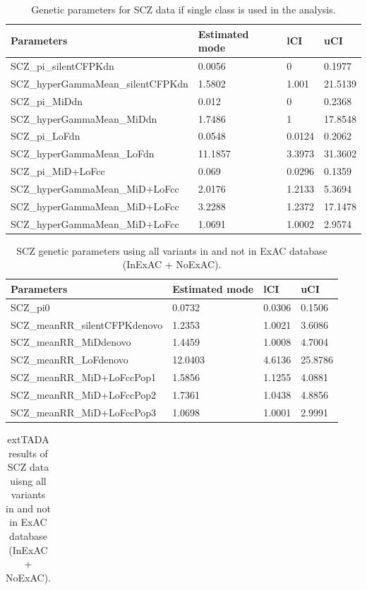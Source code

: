 \documentclass[]{article}
\begin{document}
\begin{table}[H]
\begin{tabular}{|l|l|l|l}
\hline
Parameters & Estimated mode & lCI & uCI \\
\hline
SCZ\_pi\_silentCFPKdn & 0.0056 & 0 & 0.1977\\
SCZ\_hyperGammaMean\_silentCFPKdn & 1.5802 & 1.001 & 21.5139\\
SCZ\_pi\_MiDdn & 0.012 & 0 & 0.2368\\
SCZ\_hyperGammaMean\_MiDdn & 1.7486 & 1 & 17.8548\\
SCZ\_pi\_LoFdn & 0.0548 & 0.0124 & 0.2062\\
SCZ\_hyperGammaMean\_LoFdn & 11.1857 & 3.3973 & 31.3602\\
SCZ\_pi\_MiD+LoFcc & 0.069 & 0.0296 & 0.1359\\
SCZ\_hyperGammaMean\_MiD+LoFcc & 2.0176 & 1.2133 & 5.3694\\
SCZ\_hyperGammaMean\_MiD+LoFcc & 3.2288 & 1.2372 & 17.1478\\
SCZ\_hyperGammaMean\_MiD+LoFcc & 1.0691 & 1.0002 & 2.9574\\
\hline
\end{tabular}
\caption{Genetic parameters for SCZ data if single class is used in
  the analysis.}
\label{tab:SCZgeneticParameterSingleClass}
\end{table}
\begin{table}[H]
\begin{tabular}{|l|l|l|l|}
\hline
Parameters & Estimated mode & lCI & uCI \\
\hline
SCZ\_pi0 & 0.0732 & 0.0306 & 0.1506\\
SCZ\_meanRR\_silentCFPKdenovo & 1.2353 & 1.0021 & 3.6086\\
SCZ\_meanRR\_MiDdenovo & 1.4459 & 1.0008 & 4.7004\\
SCZ\_meanRR\_LoFdenovo & 12.0403 & 4.6136 & 25.8786\\
SCZ\_meanRR\_MiD+LoFccPop1 & 1.5856 & 1.1255 & 4.0881\\
SCZ\_meanRR\_MiD+LoFccPop2 & 1.7361 & 1.0438 & 4.8856\\
SCZ\_meanRR\_MiD+LoFccPop3 & 1.0698 & 1.0001 & 2.9991\\
\hline
\end{tabular}
\caption{SCZ genetic parameters using all variants in and not in ExAC
  database (InExAC + NoExAC).}
\label{tab:SCZgeneticParametersBoth}
\end{table}
\begin{table}[H]
\begin{tabular}{l}
\end{tabular}
\caption{extTADA results of SCZ data uisng all variants in and not in
  ExAC database (InExAC + NoExAC).}
\label{tab:extTADAforCombinedSCZBoth}
\end{table}
\end{document}
